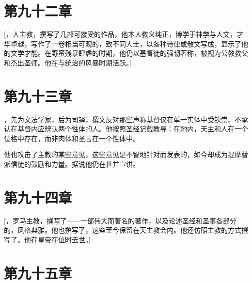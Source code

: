 
\section{第九十二章}

[，人主教，撰写了几部可接受的作品，他本人教义纯正，博学于神学与人文，才华卓越，写作了一卷相当可观的，致不同人士，以各种诗律或散文写成，显示了他的文学才能。在野蛮残暴肆虐的时期，他仍以基督徒的强韧著称，被视为公教教父和杰出圣师。他在与统治的风暴时期活跃。]\par


\section{第九十三章}

，先为文法学家，后为司铎，撰文反对那些声称基督仅在单一实体中受钦崇、不承认在基督内应辨认两个性体的人。他按照圣经记载教导：在祂内，天主和人在一个位格中存在，而非肉体和圣言在一个性体中。\par

他也攻击了主教的某些意见，这些意见是不智地针对而发表的，如今却成为提摩替派信徒的鼓励和力量。据说他仍在世并宣讲。\par


\section{第九十四章}

[，罗马主教，撰写了——一部伟大而著名的著作，以及论述圣经和圣事各部分的，风格典雅。他也撰写了，这些至今保留在天主教会内。他还仿照主教的方式撰写了。他在皇帝在位时去世。]\par


\section{第九十五章}

